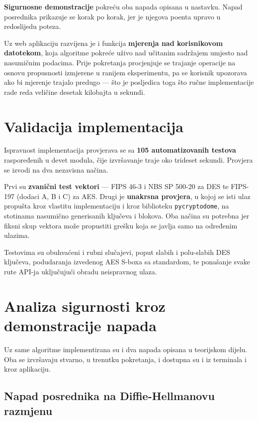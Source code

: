 \textbf{Sigurnosne demonstracije} pokreću oba napada opisana u nastavku. Napad posrednika prikazuje se korak po korak, jer je njegova poenta upravo u redoslijedu poteza.

Uz web aplikaciju razvijena je i funkcija \textbf{mjerenja nad korisnikovom datotekom}, koja algoritme pokreće uživo nad učitanim sadržajem umjesto nad nasumičnim podacima. Prije pokretanja procjenjuje se trajanje operacije na osnovu propusnosti izmjerene u ranijem eksperimentu, pa se korisnik upozorava ako bi mjerenje trajalo predugo --- što je posljedica toga što ručne implementacije rade reda veličine desetak kilobajta u sekundi.

\section{Validacija implementacija}
\label{sec:validacija}

Ispravnost implementacija provjerava se sa \textbf{105 automatizovanih testova} raspoređenih u devet modula, čije izvršavanje traje oko trideset sekundi. Provjera se izvodi na dva nezavisna načina.

Prvi su \textbf{zvanični test vektori} --- FIPS 46-3 i NBS SP 500-20 za DES te FIPS-197 (dodaci A, B i C) za AES. Drugi je \textbf{unakrsna provjera}, u kojoj se isti ulaz propušta kroz vlastitu implementaciju i kroz biblioteku \texttt{pycryptodome}, na stotinama nasumično generisanih ključeva i blokova. Oba načina su potrebna jer fiksni skup vektora može propustiti grešku koja se javlja samo na određenim ulazima.

Testovima su obuhvaćeni i rubni slučajevi, poput slabih i polu-slabih DES ključeva, podudaranja izvedenog AES S-boxa sa standardom, te ponašanje svake rute API-ja uključujući obradu neispravnog ulaza.

\section{Analiza sigurnosti kroz demonstracije napada}
\label{sec:napadi}

Uz same algoritme implementirana su i dva napada opisana u teorijskom dijelu. Oba se izvršavaju stvarno, u trenutku pokretanja, i dostupna su i iz terminala i kroz aplikaciju.

\subsection{Napad posrednika na Diffie-Hellmanovu razmjenu}
\label{subsec:mitm}


